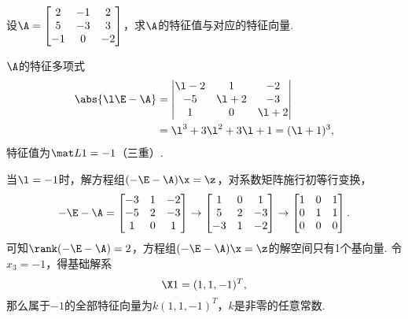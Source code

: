 \begin{example}
设\(\A = \begin{bmatrix}
2 & -1 & 2 \\
5 & -3 & 3 \\
-1 & 0 & -2
\end{bmatrix}\)，求\(\A\)的特征值与对应的特征向量.
\begin{solution}
\(\A\)的特征多项式\begin{align*}
\abs{\l\E-\A}
&= \begin{vmatrix}
\l-2 & 1 & -2 \\
-5 & \l+2 & -3 \\
1 & 0 & \l+2
\end{vmatrix} \\
&= \l^3 + 3\l^2 + 3\l + 1
= (\l+1)^3,
\end{align*}
特征值为\(\L{1}=-1\)（三重）.

当\(\l=-1\)时，解方程组\((-\E-\A)\x = \z\)，对系数矩阵施行初等行变换，\[
-\E-\A = \begin{bmatrix}
-3 & 1 & -2 \\
-5 & 2 & -3 \\
1 & 0 & 1
\end{bmatrix} \to \begin{bmatrix}
1 & 0 & 1 \\
5 & 2 & -3 \\
-3 & 1 & -2
\end{bmatrix} \to \begin{bmatrix}
1 & 0 & 1 \\
0 & 1 & 1 \\
0 & 0 & 0
\end{bmatrix}.
\]可知\(\rank(-\E-\A) = 2\)，方程组\((-\E-\A)\x = \z\)的解空间只有1个基向量.
令\(x_3 = -1\)，得基础解系\[
\X1 = (1,1,-1)^T,
\]那么属于\(-1\)的全部特征向量为\(k (1,1,-1)^T\)，\(k\)是非零的任意常数.
\end{solution}
\end{example}

